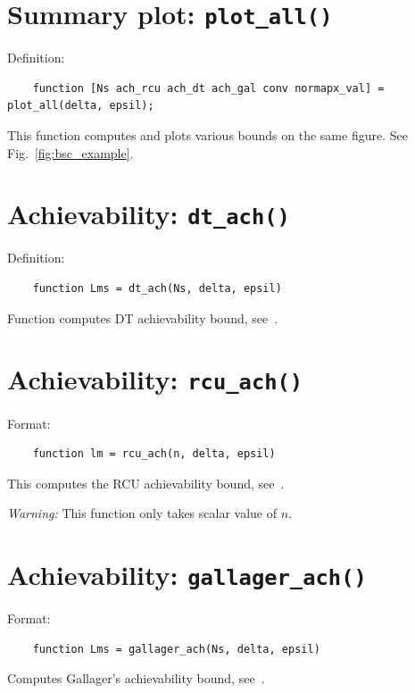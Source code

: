 \documentclass[a4paper,11p]{memoir}
\begin{document}
\section{Summary plot: \texttt{plot\_all()}}

Definition:
\begin{verbatim}
	function [Ns ach_rcu ach_dt ach_gal conv normapx_val] = plot_all(delta, epsil);
\end{verbatim}

This function computes and plots various bounds on the same figure. See Fig.~\ref{fig:bsc_example}.


\section{Achievability: \texttt{dt\_ach()}}

Definition:
\begin{verbatim}
	function Lms = dt_ach(Ns, delta, epsil)
\end{verbatim}

Function computes DT achievability bound, see~\cite[(166)]{PPV08}.

\section{Achievability: \texttt{rcu\_ach()}}
Format:
\begin{verbatim}
	function lm = rcu_ach(n, delta, epsil)
\end{verbatim}

This computes the RCU achievability bound, see~\cite[(162)]{PPV08}. %

\textit{Warning:} This function only takes scalar value of $n$.

\section{Achievability: \texttt{gallager\_ach()}}
Format:
\begin{verbatim}
	function Lms = gallager_ach(Ns, delta, epsil)
\end{verbatim}

Computes Gallager's achievability bound, see~\cite[(44)]{PPV08}.
\end{document}
